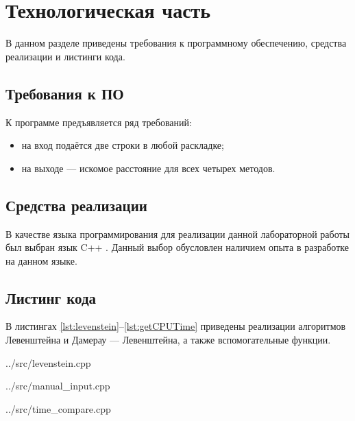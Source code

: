 \chapter{Технологическая часть}

В данном разделе приведены требования к программному обеспечению, средства реализации и листинги кода.

\section{Требования к ПО}

К программе предъявляется ряд требований:
\begin{itemize}
	\item на вход подаётся две строки в любой раскладке;
	\item на выходе — искомое расстояние для всех четырех методов.
\end{itemize}

\section{Средства реализации}

В качестве языка программирования для реализации данной лабораторной работы был выбран язык C++ \cite{cpp}. Данный выбор обусловлен наличием опыта в разработке на данном языке.

\section{Листинг кода}

В листингах \ref{lst:levenstein}--\ref{lst:getCPUTime} приведены реализации алгоритмов Левенштейна и Дамерау — Левенштейна, а также вспомогательные функции.

\begin{lstinputlisting}[
	caption={Функции реализации алгоритмов Левенштейна и Дамерау -- Левенштейна},
	label={lst:levenstein},
	style={go}
]{../src/levenstein.cpp}
\end{lstinputlisting}

\begin{lstinputlisting}[
	caption={Ввод данных пользователем},
	label={lst:manual_input},
	style={go}
	]{../src/manual_input.cpp}
\end{lstinputlisting}

\begin{lstinputlisting}[
	caption={Замер времени работы функций},
	label={lst:time_compare},
	style={go}
	]{../src/time_compare.cpp}
\end{lstinputlisting}

